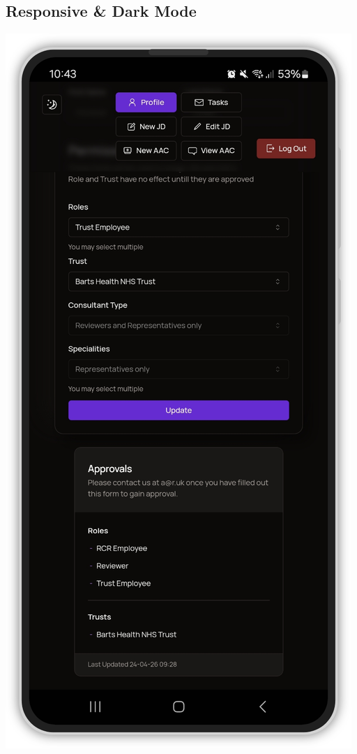 \begin{appendices}
\section{Responsive \& Dark Mode} \label{app:Mobile}
\begin{center}
\includegraphics[height=0.9\textheight]{images/mobile-profile.png}
\end{center}


\end{appendices}
